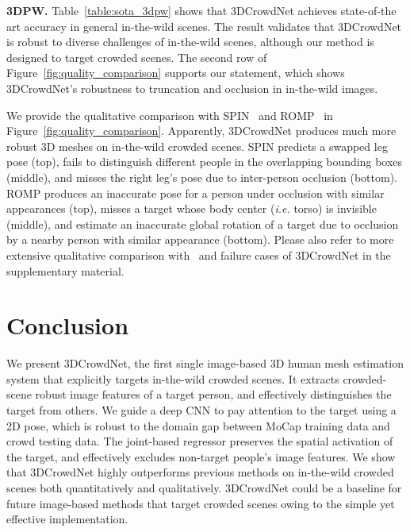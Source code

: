 \documentclass[10pt,twocolumn,letterpaper]{article}
\begin{document}
\noindent\textbf{3DPW.}
Table~\ref{table:sota_3dpw} shows that 3DCrowdNet achieves state-of-the art accuracy in general in-the-wild scenes.
The result validates that 3DCrowdNet is robust to diverse challenges of in-the-wild scenes, although our method is designed to target crowded scenes.
The second row of Figure~\ref{fig:quality_comparison} supports our statement, which shows 3DCrowdNet's robustness to truncation and occlusion in in-the-wild images.

We provide the qualitative comparison with SPIN~\cite{kolotouros2019learning} and ROMP~\cite{sun2021monocular} in Figure~\ref{fig:quality_comparison}.
Apparently, 3DCrowdNet produces much more robust 3D meshes on in-the-wild crowded scenes.
SPIN predicts a swapped leg pose (top), fails to distinguish different people in the overlapping bounding boxes (middle), and misses the right leg's pose due to inter-person occlusion (bottom).
ROMP produces an inaccurate pose for a person under occlusion with similar appearances (top), misses a target whose body center (\textit{i.e.} torso) is invisible (middle), and estimate an inaccurate global rotation of a target due to occlusion by a nearby person with similar appearance (bottom).
Please also refer to more extensive qualitative comparison with~\cite{kolotouros2019learning,moon2020i2l,choi2020p2m,sun2021monocular} and failure cases of 3DCrowdNet in the supplementary material.








 \section{Conclusion}
We present 3DCrowdNet, the first single image-based 3D human mesh estimation system that explicitly targets in-the-wild crowded scenes. 
It extracts crowded-scene robust image features of a target person, and effectively distinguishes the target from others.
We guide a deep CNN to pay attention to the target using a 2D pose, which is robust to the domain gap between MoCap training data and crowd testing data.
The joint-based regressor preserves the spatial activation of the target, and effectively excludes non-target people's image features.
We show that 3DCrowdNet highly outperforms previous methods on in-the-wild crowded scenes both quantitatively and qualitatively.
3DCrowdNet could be a baseline for future image-based methods that target crowded scenes owing to the simple yet effective implementation.
%
 
\end{document}
